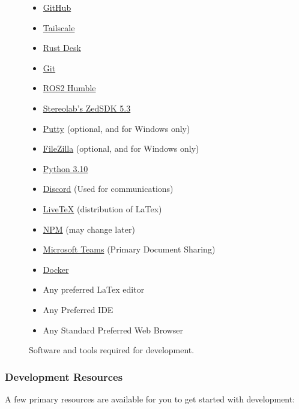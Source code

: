 \begin{figure}[H]
    \centering
    \begin{minipage}{0.9\textwidth}
        \begin{itemize}
            \item \href{https://github.com}{GitHub}
            \item \href{https://tailscale.com/download}{Tailscale}
            \item \href{https://rustdesk.com}{Rust Desk}
            \item \href{https://git-scm.com/install/}{Git}
            \item \href{https://docs.ros.org/en/humble/Installation.html}{ROS2 Humble}
            \item \href{https://www.stereolabs.com/en-ca/developers/release/}{Stereolab's ZedSDK 5.3}
            \item \href{https://putty.org/index.html}{Putty} (optional, and for Windows only)
            \item \href{https://filezilla-project.org/download.php}{FileZilla} (optional, and for Windows only)
            \item \href{https://www.python.org/downloads/release/python-3100/}{Python 3.10}
            \item \href{https://discord.com/download}{Discord} (Used for communications)
            \item \href{https://tug.org/texlive/}{LiveTeX} (distribution of LaTex)
            \item \href{https://nodejs.org/en/download}{NPM} (may change later)
            \item \href{https://windowsreport.com/how-to-install-microsoft-teams/}{Microsoft Teams} (Primary Document Sharing)
            \item \href{https://docs.docker.com/engine/install/}{Docker}
            \item Any preferred LaTex editor
            \item Any Preferred IDE
            \item Any Standard Preferred Web Browser
        \end{itemize}
    \end{minipage}
    \caption{Software and tools required for development.}
    \label{fig:dev-software}
\end{figure}

\subsubsection{Development Resources}
A few primary resources are available for you to get started with development:

